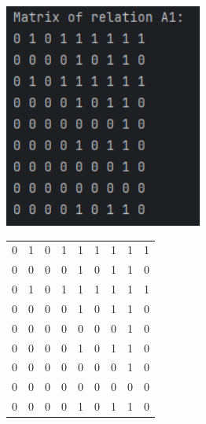 \documentclass[12pt]{article}
\begin{document}
	 
	
	\parbox[с][80mm][t]{70mm}{
		\includegraphics[width=65mm]{images/matrix1.png}
	}
	\hspace{2cm}
	\parbox[с][80mm][c]{60mm}{
		\begin{tabular} {c c c c c c c c c}
			0 & 1 & 0 & 1 & 1 & 1 & 1 & 1 & 1 \\
			0 & 0 & 0 & 0 & 1 & 0 & 1 & 1 & 0 \\
			0 & 1 & 0 & 1 & 1 & 1 & 1 & 1 & 1 \\
			0 & 0 & 0 & 0 & 1 & 0 & 1 & 1 & 0 \\
			0 & 0 & 0 & 0 & 0 & 0 & 0 & 1 & 0 \\
			0 & 0 & 0 & 0 & 1 & 0 & 1 & 1 & 0 \\
			0 & 0 & 0 & 0 & 0 & 0 & 0 & 1 & 0 \\
			0 & 0 & 0 & 0 & 0 & 0 & 0 & 0 & 0 \\
			0 & 0 & 0 & 0 & 1 & 0 & 1 & 1 & 0 \\
		\end{tabular}
	}
	
\end{document}

